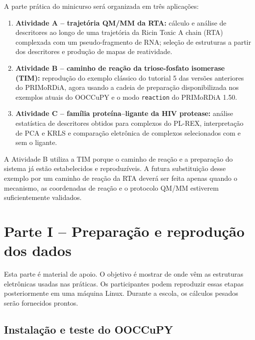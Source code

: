 \documentclass[a4paper,11pt]{refart}
\newcommand{\code}[1]{\texttt{#1}}
\begin{document}
A parte prática do minicurso será organizada em três aplicações:

\begin{enumerate}
    \item \textbf{Atividade A -- trajetória QM/MM da RTA:} cálculo e análise de descritores ao longo de uma trajetória da Ricin Toxic A chain (RTA) complexada com um pseudo-fragmento de RNA; seleção de estruturas a partir dos descritores e produção de mapas de reatividade.
    \item \textbf{Atividade B -- caminho de reação da triose-fosfato isomerase (TIM):} reprodução do exemplo clássico do tutorial 5 das versões anteriores do PRIMoRDiA, agora usando a cadeia de preparação disponibilizada nos exemplos atuais do OOCCuPY e o modo \code{reaction} do PRIMoRDiA 1.50.
    \item \textbf{Atividade C -- família proteína--ligante da HIV protease:} análise estatística de descritores obtidos para complexos do PL-REX, interpretação de PCA e KRLS e comparação eletrônica de complexos selecionados com e sem o ligante.
\end{enumerate}

\begin{comentariobox}
A Atividade B utiliza a TIM porque o caminho de reação e a preparação do sistema já estão estabelecidos e reproduzíveis. A futura substituição desse exemplo por um caminho de reação da RTA deverá ser feita apenas quando o mecanismo, as coordenadas de reação e o protocolo QM/MM estiverem suficientemente validados.
\end{comentariobox}

\section{Parte I -- Preparação e reprodução dos dados}

\begin{preparacaobox}
Esta parte é material de apoio. O objetivo é mostrar de onde vêm as estruturas eletrônicas usadas nas práticas. Os participantes podem reproduzir essas etapas posteriormente em uma máquina Linux. Durante a escola, os cálculos pesados serão fornecidos prontos.
\end{preparacaobox}

\subsection{Instalação e teste do OOCCuPY}
\end{document}
